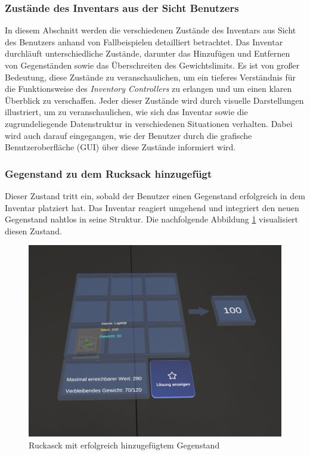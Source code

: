 \begin{itemize}
\subsubsection{Zustände des Inventars aus der Sicht Benutzers}
In diesem Abschnitt werden die verschiedenen Zustände des Inventars aus Sicht des Benutzers anhand von Fallbeispielen
detailliert betrachtet. Das Inventar durchläuft unterschiedliche Zustände, darunter das Hinzufügen und Entfernen
von Gegenständen sowie das Überschreiten des Gewichtslimits. Es ist von großer Bedeutung, diese Zustände zu
veranschaulichen, um ein tieferes Verständnis für die Funktionsweise des \textit{Inventory Controllers} zu erlangen
und um einen klaren Überblick zu verschaffen. Jeder dieser Zustände wird durch visuelle Darstellungen illustriert,
um zu veranschaulichen, wie sich das Inventar sowie die zugrundeliegende Datenstruktur in verschiedenen Situationen
verhalten. Dabei wird auch darauf eingegangen, wie der Benutzer durch die grafische Benutzeroberfläche (GUI) über
diese Zustände informiert wird.

\subsubsection*{Gegenstand zu dem Rucksack hinzugefügt}
Dieser Zustand tritt ein, sobald der Benutzer einen Gegenstand erfolgreich in dem Inventar platziert hat. Das Inventar
reagiert umgehend und integriert den neuen Gegenstand nahtlos in seine Struktur. Die nachfolgende Abbildung
\ref{fig:controller_itemAdded} visualisiert diesen Zustand.

\begin{figure}[H]
    \centering
    \includegraphics[width=\textwidth]{images/itemAdded}
    \caption{Ruckasck mit erfolgreich hinzugefügtem Gegenstand}
    \label{fig:controller_itemAdded}
\end{figure}


\end{itemize}

